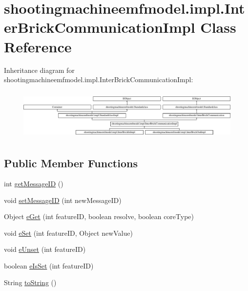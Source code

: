 \hypertarget{classshootingmachineemfmodel_1_1impl_1_1_inter_brick_communication_impl}{\section{shootingmachineemfmodel.\-impl.\-Inter\-Brick\-Communication\-Impl Class Reference}
\label{classshootingmachineemfmodel_1_1impl_1_1_inter_brick_communication_impl}
}
Inheritance diagram for shootingmachineemfmodel.\-impl.\-Inter\-Brick\-Communication\-Impl\-:\begin{figure}[H]
\begin{center}
\leavevmode
\includegraphics[height=2.607076cm]{classshootingmachineemfmodel_1_1impl_1_1_inter_brick_communication_impl}
\end{center}
\end{figure}
\subsection*{Public Member Functions}
\begin{DoxyCompactItemize}
\item 
int \hyperlink{classshootingmachineemfmodel_1_1impl_1_1_inter_brick_communication_impl_ace5e994ef218bf1074d002ebaef563b0}{get\-Message\-I\-D} ()
\item 
void \hyperlink{classshootingmachineemfmodel_1_1impl_1_1_inter_brick_communication_impl_a21dd3927632c4447e9d13d18bc3fe12a}{set\-Message\-I\-D} (int new\-Message\-I\-D)
\item 
Object \hyperlink{classshootingmachineemfmodel_1_1impl_1_1_inter_brick_communication_impl_a06b9e3cf4b3f7751712cbeec8bcd281b}{e\-Get} (int feature\-I\-D, boolean resolve, boolean core\-Type)
\item 
void \hyperlink{classshootingmachineemfmodel_1_1impl_1_1_inter_brick_communication_impl_a796c22f5f2a6ba90db0949a6599855cb}{e\-Set} (int feature\-I\-D, Object new\-Value)
\item 
void \hyperlink{classshootingmachineemfmodel_1_1impl_1_1_inter_brick_communication_impl_a57e6eb4c83bad4ca86a3a20af4ffa8ea}{e\-Unset} (int feature\-I\-D)
\item 
boolean \hyperlink{classshootingmachineemfmodel_1_1impl_1_1_inter_brick_communication_impl_afe8bce84586d4fd6d0a3ef980f6ea8b2}{e\-Is\-Set} (int feature\-I\-D)
\item 
String \hyperlink{classshootingmachineemfmodel_1_1impl_1_1_inter_brick_communication_impl_a62053a8e7cde15cd2aa88d49be129129}{to\-String} ()
\end{DoxyCompactItemize}
